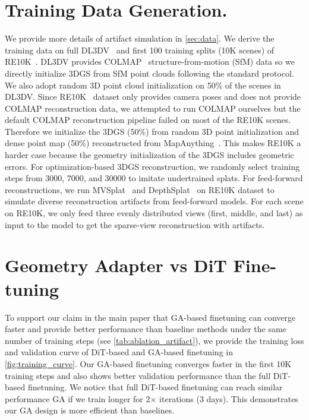\section{Training Data Generation.}
\label{supp:training_data}
We provide more details of artifact simulation in \cref{sec:data}. We derive the training data on full DL3DV~\cite{ling2024dl3dv} and first 100 training splits (10K scenes) of RE10K~\cite{re10k}. DL3DV provides COLMAP~\cite{schoenberger2016colmap} structure-from-motion (SfM) data so we directly initialize 3DGS from SfM point clouds following the standard protocol. We also adopt random 3D point cloud initialization on 50\% of the scenes in DL3DV. Since RE10K~\cite{re10k} dataset only provides camera poses and does not provide COLMAP reconstruction data, we attempted to run COLMAP ourselves but the default COLMAP reconstruction pipeline failed on most of the RE10K scenes. Therefore we initialize the 3DGS (50\%) from random 3D point initialization and dense point map (50\%) reconstructed from MapAnything~\cite{keetha2025mapanything}. This makes RE10K a harder case because the geometry initialization of the 3DGS includes geometric errors. For optimization-based 3DGS reconstruction, we randomly select training steps from 3000, 7000, and 30000 to imitate undertrained splats.
For feed-forward reconstructions, we run MVSplat~\cite{chen2024mvsplat} and DepthSplat~\cite{xu2024depthsplat} on RE10K dataset to simulate diverse reconstruction artifacts from feed-forward models. For each scene on RE10K, we only feed three evenly distributed views (first, middle, and last) as input to the model to get the sparse-view reconstruction with artifacts.

\section{Geometry Adapter vs DiT Fine-tuning}
\label{supp:finetuning}
To support our claim in the main paper that GA-based finetuning can converge faster and provide better performance than baseline methods under the same number of training steps (see \cref{tab:ablation_artifact}), we provide the training loss and validation curve of DiT-based and GA-based finetuning in \cref{fig:training_curve}. Our GA-based finetuning converges faster in the first 10K training steps and also shows better validation performance than the full DiT-based finetuning. We notice that full DiT-based finetuning can reach similar performance \wrt GA if we train longer for 2$\times$ iterations (3 days). This demonstrates our GA design is more efficient than baselines.

